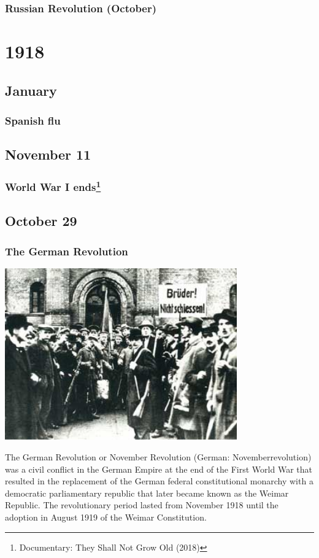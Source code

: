 \documentclass[11pt]{report}
\begin{document}
\subsection{Russian Revolution (October)}


\chapter{1918}
\section{January}
\subsection{Spanish flu}

\section{November 11}
\subsection{World War I ends\protect\footnote{Documentary: They Shall Not Grow Old (2018)}}

\section{October 29}
\subsection{The German Revolution}
\vspace{2mm}\begin{center}\includegraphics[width=10cm]{./img/germanRevolution.jpg}\end{center}
The German Revolution or November Revolution (German: Novemberrevolution) was a civil conflict in the German Empire at the end of the First World War that resulted in the replacement of the German federal constitutional monarchy with a democratic parliamentary republic that later became known as the Weimar Republic. The revolutionary period lasted from November 1918 until the adoption in August 1919 of the Weimar Constitution.
\end{document}
